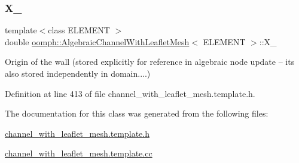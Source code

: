 \subsubsection{\texorpdfstring{X\+\_}{X\_0}}
{\footnotesize\ttfamily template$<$class E\+L\+E\+M\+E\+NT $>$ \\
double \hyperlink{classoomph_1_1AlgebraicChannelWithLeafletMesh}{oomph\+::\+Algebraic\+Channel\+With\+Leaflet\+Mesh}$<$ E\+L\+E\+M\+E\+NT $>$\+::X\+\_\hspace{0.3cm}{\ttfamily [protected]}}

Origin of the wall (stored explicitly for reference in algebraic node update -- it\textquotesingle{}s also stored independently in domain....) 

Definition at line 413 of file channel\+\_\+with\+\_\+leaflet\+\_\+mesh.\+template.\+h.



The documentation for this class was generated from the following files\+:\begin{DoxyCompactItemize}
\item 
\hyperlink{channel__with__leaflet__mesh_8template_8h}{channel\+\_\+with\+\_\+leaflet\+\_\+mesh.\+template.\+h}\item 
\hyperlink{channel__with__leaflet__mesh_8template_8cc}{channel\+\_\+with\+\_\+leaflet\+\_\+mesh.\+template.\+cc}\end{DoxyCompactItemize}
